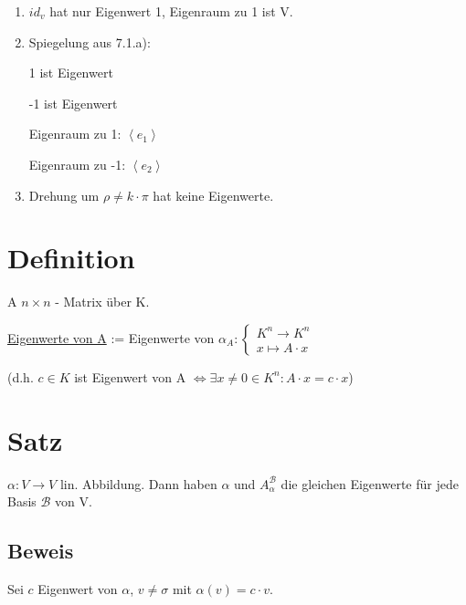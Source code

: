 \documentclass[a4paper, openany]{book}
\begin{document}
        \begin{enumerate}[label=(\alph*)]
          \item $id_v$ hat nur Eigenwert 1, Eigenraum zu 1 ist V.

          \item Spiegelung aus 7.1.a):

          1 ist Eigenwert

          -1 ist Eigenwert

          Eigenraum zu 1: $\left \langle e_1 \right \rangle$

          Eigenraum zu -1: $\left \langle e_2 \right \rangle$

          \item Drehung um $\rho \neq k \cdot \pi$ hat keine Eigenwerte.
        \end{enumerate}

        \section{Definition}

        A $n \times n$ - Matrix über K. 

        \underline{Eigenwerte von A} := Eigenwerte von $\alpha_{A} : \begin{cases}K^n \rightarrow K^n \\ x \mapsto A \cdot x \end{cases}$

        (d.h. $c \in K$ ist Eigenwert von A $\Leftrightarrow \exists x \neq 0 \in K^n : A \cdot x = c \cdot x$)

        \section{Satz}

        $\alpha : V \rightarrow V$ lin. Abbildung. Dann haben $\alpha$ und $A_{\alpha}^{\mathcal{B}}$ die gleichen Eigenwerte für jede Basis $\mathcal{B}$ von V.

        \subsection{Beweis}

        Sei $c$ Eigenwert von $\alpha$, $v \neq \sigma$ mit $\alpha(v) = c \cdot v$.

        \par \medskip

        \par \medskip
\end{document}
